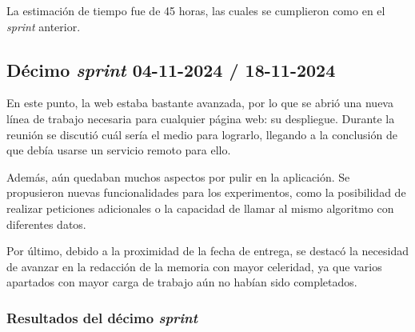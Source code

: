 La estimación de tiempo fue de 45 horas, las cuales se cumplieron como en el \textit{sprint} anterior.

\subsection{Décimo \textit{sprint} 04-11-2024 / 18-11-2024}

En este punto, la web estaba bastante avanzada, por lo que se abrió una nueva línea de trabajo necesaria para cualquier página web: su despliegue. Durante la reunión se discutió cuál sería el medio para lograrlo, llegando a la conclusión de que debía usarse un servicio remoto para ello.

Además, aún quedaban muchos aspectos por pulir en la aplicación. Se propusieron nuevas funcionalidades para los experimentos, como la posibilidad de realizar peticiones adicionales o la capacidad de llamar al mismo algoritmo con diferentes datos.

Por último, debido a la proximidad de la fecha de entrega, se destacó la necesidad de avanzar en la redacción de la memoria con mayor celeridad, ya que varios apartados con mayor carga de trabajo aún no habían sido completados.

\subsubsection{Resultados del décimo \textit{sprint}}

